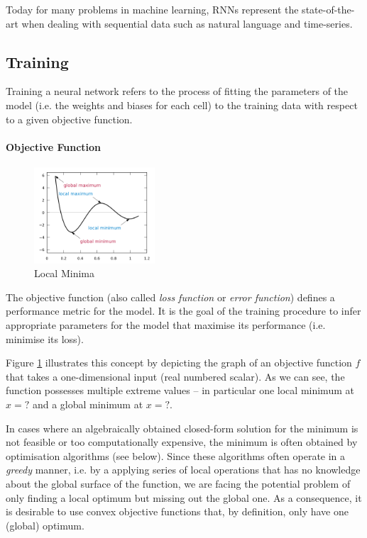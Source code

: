 Today for many problems in machine learning, RNNs represent the state-of-the-art when dealing with sequential data such as natural language and time-series. 

\subsection{Training}\label{sec:training}
Training a neural network refers to the process of fitting the parameters of the model (i.e. the weights and biases for each cell) to the training data with respect to a given objective function. 

\paragraph{Objective Function}
\begin{figure}
	\centering
	\includegraphics[width=0.4\textwidth]{figures/chapter-2/local-minima.png}
	\caption{Local Minima}\label{fig:local-minima}   
\end{figure}

The objective function (also called \emph{loss function} or \emph{error function}) defines a performance metric for the model. It is the goal of the training procedure to infer appropriate parameters for the model that maximise its performance (i.e. minimise its loss). 

Figure \ref{fig:local-minima} illustrates this concept by depicting the graph of an objective function $f$ that takes a one-dimensional input (real numbered scalar). As we can see, the function possesses multiple extreme values -- in particular one local minimum at $x = ?$%
and a global minimum at $x = ?$. %


In cases where an algebraically obtained closed-form solution for the minimum is not feasible or too computationally expensive, the minimum is often obtained by optimisation algorithms (see below). Since these algorithms often operate in a \emph{greedy} manner, i.e. by a applying series of local operations that has no knowledge about the global surface of the function, we are facing the potential problem of only finding a local optimum but missing out the global one. As a consequence, it is desirable to use convex objective functions that, by definition, only have one (global) optimum. 

